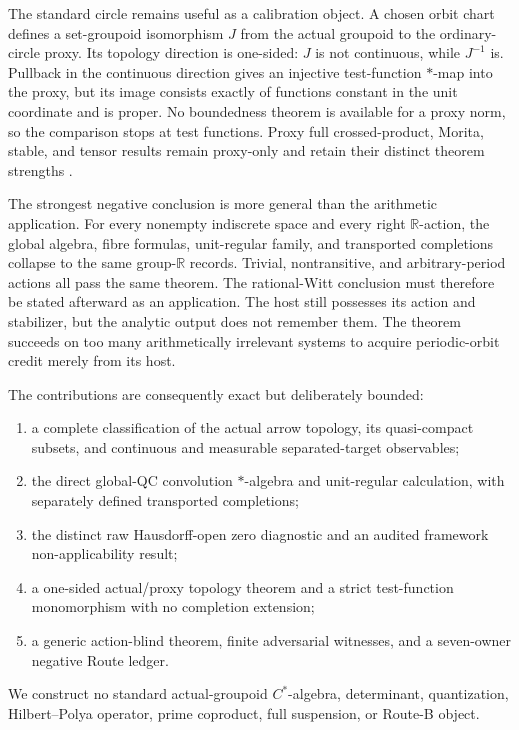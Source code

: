 \documentclass[11pt]{article}
\theoremstyle{definition}
\newcommand{\R}{\mathbb R}
\begin{document}
The standard circle remains useful as a calibration object.  A chosen orbit
chart defines a set-groupoid isomorphism $J$ from the actual groupoid to the
ordinary-circle proxy.  Its topology direction is one-sided: $J$ is not
continuous, while $J^{-1}$ is.  Pullback in the continuous direction gives
an injective test-function $*$-map into the proxy, but its image consists
exactly of functions constant in the unit coordinate and is proper.  No
boundedness theorem is available for a proxy norm, so the comparison stops
at test functions.  Proxy full crossed-product, Morita, stable, and tensor
results remain proxy-only and retain their distinct theorem strengths
\cite[Proposition~3, physical p.~13 / printed p.~203]{Green1978}
\cite[Theorem~2.8, physical p.~8 / printed p.~10]{MuhlyRenaultWilliams1987}
\cite[Theorem~1.2, physical p.~4 / printed p.~351]{BrownGreenRieffel1977}
\cite{BussHolkarMeyer2018,Williams2007}.

The strongest negative conclusion is more general than the arithmetic
application.  For every nonempty indiscrete space and every right
$\R$-action, the global algebra, fibre formulas, unit-regular family, and
transported completions collapse to the same group-$\R$ records.  Trivial,
nontransitive, and arbitrary-period actions all pass the same theorem.  The
rational-Witt conclusion must therefore be stated afterward as an
application.  The host still possesses its action and stabilizer, but the
analytic output does not remember them.  The theorem succeeds on too many
arithmetically irrelevant systems to acquire periodic-orbit credit merely
from its host.

The contributions are consequently exact but deliberately bounded:
\begin{enumerate}
\item a complete classification of the actual arrow topology, its
  quasi-compact subsets, and continuous and measurable separated-target
  observables;
\item the direct global-QC convolution $*$-algebra and unit-regular
  calculation, with separately defined transported completions;
\item the distinct raw Hausdorff-open zero diagnostic and an audited
  framework non-applicability result;
\item a one-sided actual/proxy topology theorem and a strict test-function
  monomorphism with no completion extension;
\item a generic action-blind theorem, finite adversarial witnesses, and a
  seven-owner negative Route ledger.
\end{enumerate}
We construct no standard actual-groupoid $C^*$-algebra, determinant,
quantization, Hilbert--Polya operator, prime coproduct, full suspension, or
Route-B object.
\end{document}

